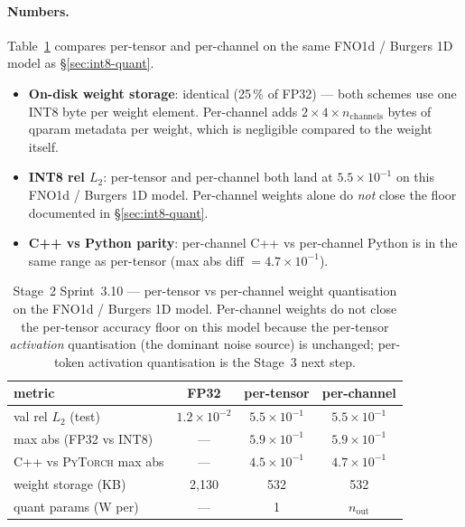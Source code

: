 \documentclass[10pt,twocolumn]{article}
\newcommand{\py}{\textsc{PyTorch}}
\begin{document}
\paragraph{Numbers.}
Table~\ref{tab:int8-per-channel} compares per-tensor
and per-channel on the same FNO1d / Burgers 1D model as
\S\ref{sec:int8-quant}.
\begin{itemize}
\item \textbf{On-disk weight storage}: identical
(25\,\% of FP32) --- both schemes use one INT8 byte
per weight element.  Per-channel adds $2 \times 4
\times n_{\mathrm{channels}}$ bytes of qparam metadata
per weight, which is negligible compared to the
weight itself.
\item \textbf{INT8 rel $L_2$}: per-tensor and
per-channel both land at $5.5 \times 10^{-1}$ on this
FNO1d / Burgers 1D model.  Per-channel weights alone
do \emph{not} close the floor documented in
\S\ref{sec:int8-quant}.
\item \textbf{C{++} vs Python parity}: per-channel
C{++} vs per-channel Python is in the same range as
per-tensor (max abs diff $= 4.7 \times 10^{-1}$).
\end{itemize}

\begin{table}[ht]
\centering
\caption{Stage~2 Sprint~3.10 --- per-tensor vs
per-channel weight quantisation on the FNO1d / Burgers
1D model.  Per-channel weights do not close the
per-tensor accuracy floor on this model because the
per-tensor \emph{activation} quantisation (the
dominant noise source) is unchanged; per-token
activation quantisation is the Stage~3 next step.}
\label{tab:int8-per-channel}
\smallskip
\begin{tabular}{lccc}
\toprule
metric & FP32 & per-tensor & per-channel \\
\midrule
val rel $L_2$ (test) & $1.2 \times 10^{-2}$ &
$5.5 \times 10^{-1}$ & $5.5 \times 10^{-1}$ \\
max abs (FP32 vs INT8) & --- &
$5.9 \times 10^{-1}$ & $5.9 \times 10^{-1}$ \\
C{++} vs \py{} max abs & --- &
$4.5 \times 10^{-1}$ & $4.7 \times 10^{-1}$ \\
weight storage (KB)   & 2{,}130 & 532 & 532 \\
quant params (W per)  & --- & 1 & $n_{\mathrm{out}}$ \\
\bottomrule
\end{tabular}
\end{table}
\end{document}
